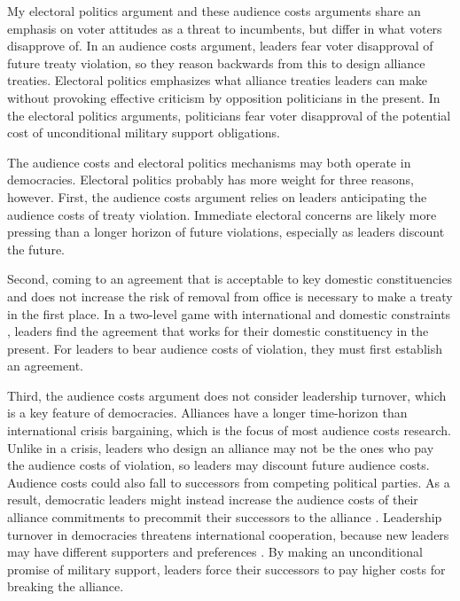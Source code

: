\documentclass[12pt]{article}
\begin{document}
My electoral politics argument and these audience costs arguments share an emphasis on voter attitudes as a threat to incumbents, but differ in what voters disapprove of. 
In an audience costs argument, leaders fear voter disapproval of future treaty violation, so they reason backwards from this to design alliance treaties. 
Electoral politics emphasizes what alliance treaties leaders can make without provoking effective criticism by opposition politicians in the present. 
In the electoral politics arguments, politicians fear voter disapproval of the potential cost of unconditional military support obligations.
     

The audience costs and electoral politics mechanisms may both operate in democracies. 
Electoral politics probably has more weight for three reasons, however. 
First, the audience costs argument relies on leaders anticipating the audience costs of treaty violation.  
Immediate electoral concerns are likely more pressing than a longer horizon of future violations, especially as leaders discount the future.  


Second, coming to an agreement that is acceptable to key domestic constituencies and does not increase the risk of removal from office is necessary to make a treaty in the first place. 
In a two-level game with international and domestic constraints \citep{Putnam1988}, leaders find the agreement that works for their domestic constituency in the present. 
For leaders to bear audience costs of violation, they must first establish an agreement. 


Third, the audience costs argument does not consider leadership turnover, which is a key feature of democracies. 
Alliances have a longer time-horizon than international crisis bargaining, which is the focus of most audience costs research. 
Unlike in a crisis, leaders who design an alliance may not be the ones who pay the audience costs of violation, so leaders may discount future audience costs. 
Audience costs could also fall to successors from competing political parties. 
As a result, democratic leaders might instead increase the audience costs of their alliance commitments to precommit their successors to the alliance \citep{Mattes2012a}. 
Leadership turnover in democracies threatens international cooperation, because new leaders may have different supporters and preferences \citep{Lobell2004, Narizny2007, Leedsetal2009}. 
By making an unconditional promise of military support, leaders force their successors to pay higher costs for breaking the alliance. 
\end{document}
